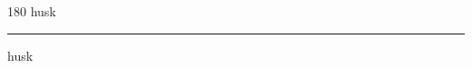
\begin{frame}
\begin{center}
\begin{turn}{180}
{\fontsize{2.5cm}{1em}\selectfont husk}
\end{turn}
\vspace{1em}\par  
\hrule
\vspace{1em}\par  
{\fontsize{2.5cm}{1em}\selectfont husk}
\end{center}
\end{frame}
